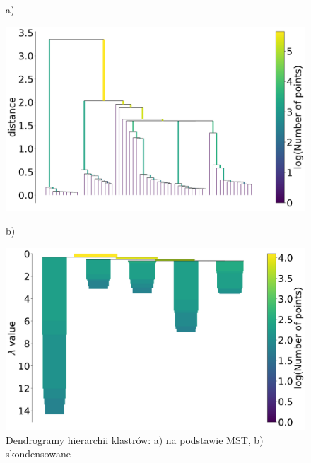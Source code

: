 	\begin{figure}[htb]
		\centering
		\begin{minipage}{.5\textwidth}
			a)\par\medskip %
			\begin{flushleft}
				\includegraphics[width=.95\linewidth]{rys04/hdbscan_slt.png}
			\end{flushleft}
		\end{minipage}%
		\begin{minipage}{.5\textwidth}
			b)\par\medskip %
			\begin{flushright}
				\includegraphics[width=.95\linewidth]{rys04/hdbscan_ct.png}
			\end{flushright}
		\end{minipage}
		\caption{Dendrogramy hierarchii klastrów: a) na podstawie MST, b) skondensowane}\label{fig:dendrogram} %
	\end{figure}
